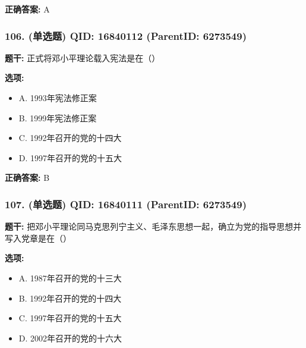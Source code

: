 \documentclass[12pt,UTF8]{ctexart}
\begin{document}
\textbf{正确答案:}
A

\vspace{0.3em}\hrulefill\vspace{0.7em}

\subsubsection*{106. (单选题) \small QID: 16840112 (ParentID: 6273549)}

\textbf{题干:}
正式将邓小平理论载入宪法是在（）



\textbf{选项:}
\begin{itemize}[leftmargin=*]

  \item A. 1993年宪法修正案

  \item B. 1999年宪法修正案

  \item C. 1992年召开的党的十四大

  \item D. 1997年召开的党的十五大

\end{itemize}

\textbf{正确答案:}
B

\vspace{0.3em}\hrulefill\vspace{0.7em}

\subsubsection*{107. (单选题) \small QID: 16840111 (ParentID: 6273549)}

\textbf{题干:}
把邓小平理论同马克思列宁主义、毛泽东思想一起，确立为党的指导思想并写入党章是在（）



\textbf{选项:}
\begin{itemize}[leftmargin=*]

  \item A. 1987年召开的党的十三大

  \item B. 1992年召开的党的十四大

  \item C. 1997年召开的党的十五大

  \item D. 2002年召开的党的十六大

\end{itemize}
\end{document}
